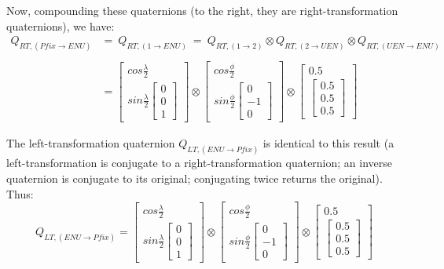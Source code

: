 \documentclass[11pt,fleqn]{report}
\begin{document}
Now, compounding these quaternions (to the right, they are right-transformation
quaternions), we have:
\begin{align*}
 Q_{RT, (Pfix \rightarrow ENU)} &=
 ~Q_{RT, (1 \rightarrow ENU)}~ =
 ~Q_{RT, (1 \rightarrow 2)}\otimes
 Q_{RT, (2 \rightarrow UEN)} \otimes
 Q_{RT, (UEN \rightarrow ENU)} \\
 \\
 &= \begin{bmatrix}
 cos \frac{\lambda}{2} \\
 sin \frac{\lambda}{2}
 \begin{bmatrix}
 0 \\ 0 \\ 1
 \end{bmatrix}
 \end{bmatrix} \otimes
 \begin{bmatrix}
 cos \frac{\phi}{2} \\
 sin \frac{\phi}{2}
 \begin{bmatrix}
 0 \\ -1 \\ 0
 \end{bmatrix}
 \end{bmatrix} \otimes
 \begin{bmatrix}
 0.5 \\
 \begin{bmatrix}
 0.5 \\ 0.5 \\ 0.5
 \end{bmatrix}
 \end{bmatrix}
\end{align*}


The left-transformation quaternion $Q_{LT, (ENU \rightarrow Pfix)}$ is identical
to this result (a left-transformation is conjugate to a right-transformation
quaternion; an inverse quaternion is conjugate to its original; conjugating
twice returns the original). Thus:
\begin{equation}
Q_{LT, (ENU \rightarrow Pfix)} =
 \begin{bmatrix}
 cos \frac{\lambda}{2} \\
 sin \frac{\lambda}{2}
 \begin{bmatrix}
 0 \\ 0 \\ 1
 \end{bmatrix}
 \end{bmatrix} \otimes
 \begin{bmatrix}
 cos \frac{\phi}{2} \\
 sin \frac{\phi}{2}
 \begin{bmatrix}
 0 \\ -1 \\ 0
 \end{bmatrix}
 \end{bmatrix} \otimes
 \begin{bmatrix}
 0.5 \\
 \begin{bmatrix}
 0.5 \\ 0.5 \\ 0.5
 \end{bmatrix}
 \end{bmatrix}
\end{equation}
\end{document}
